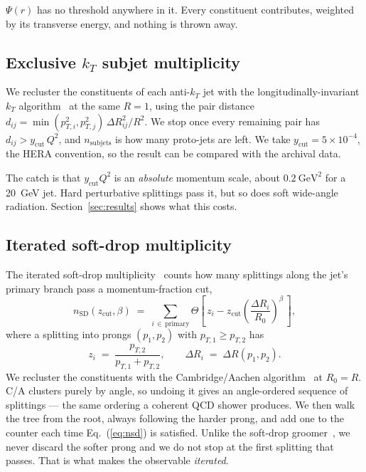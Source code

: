 \documentclass[reprint,amsmath,amssymb,aps,prd,floatfix]{revtex4-2}
\begin{document}
$\Psi(r)$ has no threshold anywhere in it. Every constituent contributes,
weighted by its transverse energy, and nothing is thrown away.

\subsection{Exclusive $k_T$ subjet multiplicity}

We recluster the constituents of each anti-$k_T$ jet with the
longitudinally-invariant $k_T$ algorithm~\cite{Catani:1993hr} at the same
$R = 1$, using the pair distance
$d_{ij} = \min(p_{T,i}^2, p_{T,j}^2)\,\Delta R_{ij}^2/R^2$. We stop once every
remaining pair has $d_{ij} > y_{\mathrm{cut}}\,Q^2$, and $n_{\mathrm{subjets}}$
is how many proto-jets are left. We take $y_{\mathrm{cut}} = 5\times10^{-4}$,
the HERA convention, so the result can be compared with the archival data.

The catch is that $y_{\mathrm{cut}}Q^2$ is an \emph{absolute} momentum scale,
about $0.2~\mathrm{GeV}^2$ for a 20~GeV jet. Hard perturbative splittings pass
it, but so does soft wide-angle radiation. Section~\ref{sec:results} shows what
this costs.

\subsection{Iterated soft-drop multiplicity}

The iterated soft-drop multiplicity~\cite{Frye:2017yrw} counts how many
splittings along the jet's primary branch pass a momentum-fraction cut,
\begin{equation}
n_{\mathrm{SD}}(z_{\mathrm{cut}},\beta) \;=\;
\sum_{i \,\in\, \mathrm{primary}}
\Theta\!\left[\, z_i - z_{\mathrm{cut}}
\left(\frac{\Delta R_i}{R_0}\right)^{\!\beta} \,\right],
\label{eq:nsd}
\end{equation}
where a splitting into prongs $(p_1, p_2)$ with $p_{T,1} \ge p_{T,2}$ has
\begin{equation}
z_i \;=\; \frac{p_{T,2}}{p_{T,1} + p_{T,2}}, \qquad
\Delta R_i \;=\; \Delta R(p_1, p_2).
\end{equation}
We recluster the constituents with the Cambridge/Aachen
algorithm~\cite{Dokshitzer:1997in,Wobisch:1998wt} at $R_0 = R$. C/A clusters
purely by angle, so undoing it gives an angle-ordered sequence of splittings ---
the same ordering a coherent QCD shower produces. We then walk the tree from the
root, always following the harder prong, and add one to the counter each time
Eq.~(\ref{eq:nsd}) is satisfied. Unlike the soft-drop
groomer~\cite{Larkoski:2014wba}, we never discard the softer prong and we do not
stop at the first splitting that passes. That is what makes the observable
\emph{iterated}.
\end{document}
